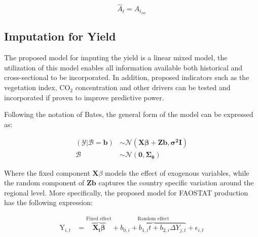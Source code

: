 \documentclass[nojss]{jss}\usepackage[]{graphicx}\usepackage[]{color}
\begin{document}
\begin{equation}
  \label{eq:locf}
  \hat{A}_t = A_{t_{nn}}
\end{equation}



\subsection{Imputation for Yield}
The proposed model for imputing the yield is a linear mixed model, the
utilization of this model enables all information available both
historical and cross-sectional to be incorporated. In addition,
proposed indicators such as the vegetation index, $\text{CO}_2$
concentration and other drivers can be tested and incorporated if
proven to improve predictive power.

Following the notation of Bates, the general form of the model can be
expressed as:

\begin{align}
  (\mathscr{Y}|\mathscr{B} = \mathbf{b}) &\sim
  \mathscr{N}(\mathbf{X}\boldsymbol{\beta} + \mathbf{Z}\mathbf{b},
  \boldsymbol{\sigma^2}\mathbf{I})\nonumber \\
  \mathscr{B} &\sim\mathscr{N}(\mathbf{0}, \boldsymbol{\Sigma_\theta})
\end{align}


Where the fixed component $\mathbf{X}\mathscr{\beta}$ models the
effect of exogenous variables, while the random component of
$\mathbf{Z}\mathbf{b}$ captures the country specific variation
around the regional level.  More specifically, the proposed model for
FAOSTAT production has the following expression:

\begin{align}
  \label{eq:lmeImpute}
  \text{Y}_{i,t} &= \overbrace{\mathbf{X_i}\boldsymbol{\beta}}^{\text{Fixed effect}} +
  \overbrace{b_{0,i} + b_{1,i}t + b_{2,i}\Delta{Y}_{j,t}}^{\text{Random effect}} +
  \epsilon_{i,t}
\end{align}
\end{document}
